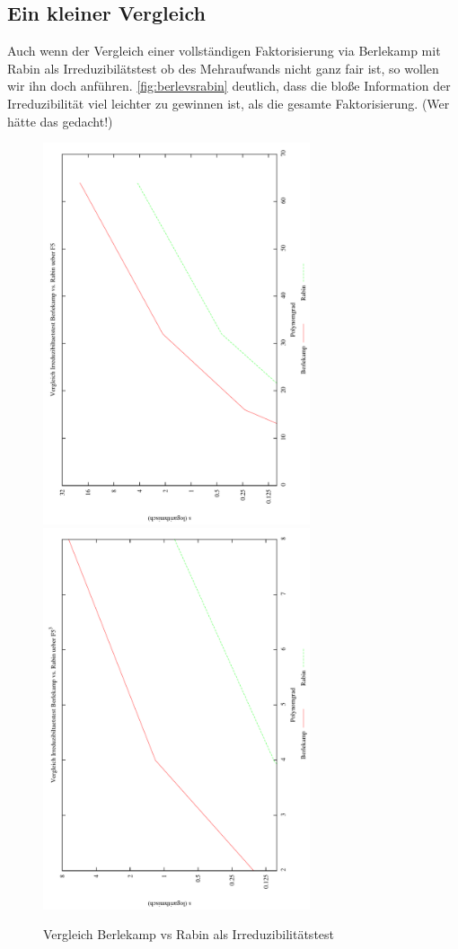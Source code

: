 
\subsection{Ein kleiner Vergleich}

Auch wenn der Vergleich einer vollständigen Faktorisierung via Berlekamp mit
Rabin als Irreduzibilätstest ob des Mehraufwands nicht ganz fair ist, so wollen
wir ihn doch anführen. \autoref{fig:berlevsrabin} deutlich, dass die bloße Information der
Irreduzibilität viel leichter zu gewinnen ist, als die gesamte Faktorisierung.
(Wer hätte das gedacht!)

\begin{figure}
  \caption{Vergleich Berlekamp vs Rabin als Irreduzibilitätstest}
  \label{fig:berlevsrabin}
  \centering
  \includegraphics[angle=-90,width=0.7\textwidth]{plots/benchBerleVsRabin_F5.pdf}
  \includegraphics[angle=-90,width=0.7\textwidth]{plots/benchBerleVsRabin_F53.pdf}
\end{figure}

